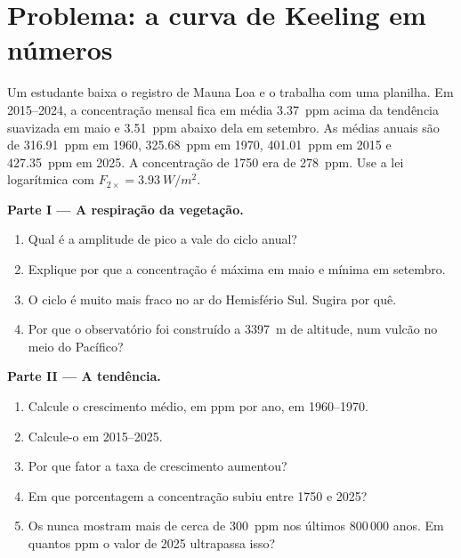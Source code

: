 \section{Problema: a curva de Keeling em números}

\begin{problem}
\label{pb:g12:climate-change:1}
Um estudante baixa o registro de Mauna Loa e o trabalha com uma planilha. Em
2015--2024, a concentração mensal fica em média \qty{3.37}{ppm} acima da
tendência suavizada em maio e \qty{3.51}{ppm} abaixo dela em setembro. As
médias anuais são de \qty{316.91}{ppm} em 1960, \qty{325.68}{ppm} em 1970,
\qty{401.01}{ppm} em 2015 e \qty{427.35}{ppm}
em 2025. A concentração de 1750 era de \qty{278}{ppm}. Use a lei logarítmica
com $F_{2\times} = \qty{3.93}{W/m^2}$.

\medskip
\noindent\textbf{Parte I --- A respiração da vegetação.}
\begin{enumerate}
  \item Qual é a amplitude de pico a vale do ciclo anual?
  \item Explique por que a concentração é máxima em maio e mínima em
        setembro.
  \item O ciclo é muito mais fraco no ar do Hemisfério Sul. Sugira por quê.
  \item Por que o observatório foi construído a \qty{3397}{m} de altitude,
        num vulcão no meio do Pacífico?
\end{enumerate}

\medskip
\noindent\textbf{Parte II --- A tendência.}
\begin{enumerate}[resume]
  \item Calcule o crescimento médio, em ppm por ano, em 1960--1970.
  \item Calcule-o em 2015--2025.
  \item Por que fator a taxa de crescimento aumentou?
  \item Em que porcentagem a concentração subiu entre 1750 e 2025?
  \item Os  nunca mostram mais de cerca de
        \qty{300}{ppm} nos últimos 800\,000 anos. Em quantos ppm o valor
        de 2025 ultrapassa isso?
\end{enumerate}


\end{problem}
